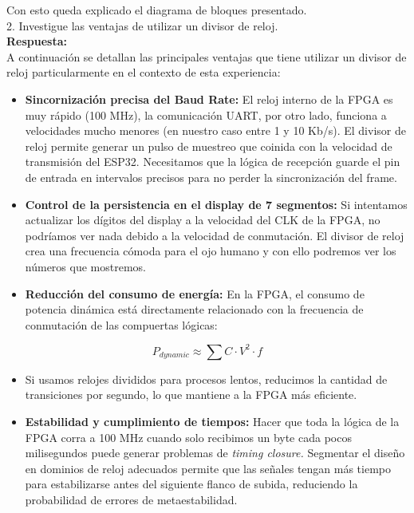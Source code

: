 \documentclass[letterpaper, 12pt]{article}
\begin{document}
Con esto queda explicado el diagrama de bloques presentado.\\

2. Investigue las ventajas de utilizar un divisor de reloj.\\

\textbf{Respuesta:}\\

A continuación se detallan las principales ventajas que tiene utilizar un divisor de reloj particularmente en el contexto de esta experiencia:

\begin{itemize}
    \item[\textbf{1.}] \textbf{Sincornización precisa del Baud Rate:} El reloj interno de la FPGA es muy rápido (100 MHz), la comunicación UART, por otro lado, funciona a velocidades mucho menores (en nuestro caso entre 1 y 10 Kb/s). El divisor de reloj permite generar un pulso de muestreo que coinida con la velocidad de transmisión del ESP32. Necesitamos que la lógica de recepción guarde el pin de entrada en intervalos precisos para no perder la sincronización del frame.

    \item[\textbf{2.}] \textbf{Control de la persistencia en el display de 7 segmentos:} Si intentamos actualizar los dígitos del display a la velocidad del CLK de la FPGA, no podríamos ver nada debido a la velocidad de conmutación. El divisor de reloj crea una frecuencia cómoda para el ojo humano y con ello podremos ver los números que mostremos.

    \item[\textbf{3.}] \textbf{Reducción del consumo de energía:} En la FPGA, el consumo de potencia dinámica está directamente relacionado con la frecuencia de conmutación de las compuertas lógicas:
\end{itemize}
\[
P_{dynamic} \approx \sum C\cdot V^{2} \cdot f
\]
\begin{itemize}
    \item[] Si usamos relojes divididos para procesos lentos, reducimos la cantidad de transiciones por segundo, lo que mantiene a la FPGA más eficiente.

    \item[\textbf{4.}] \textbf{Estabilidad y cumplimiento de tiempos:} Hacer que toda la lógica de la FPGA corra a 100 MHz cuando solo recibimos un byte cada pocos milisegundos puede generar problemas de \textit{timing closure.} Segmentar el diseño en dominios de reloj adecuados permite que las señales tengan más tiempo para estabilizarse antes del siguiente flanco de subida, reduciendo la probabilidad de errores de metaestabilidad.
\end{itemize}
\end{document}
